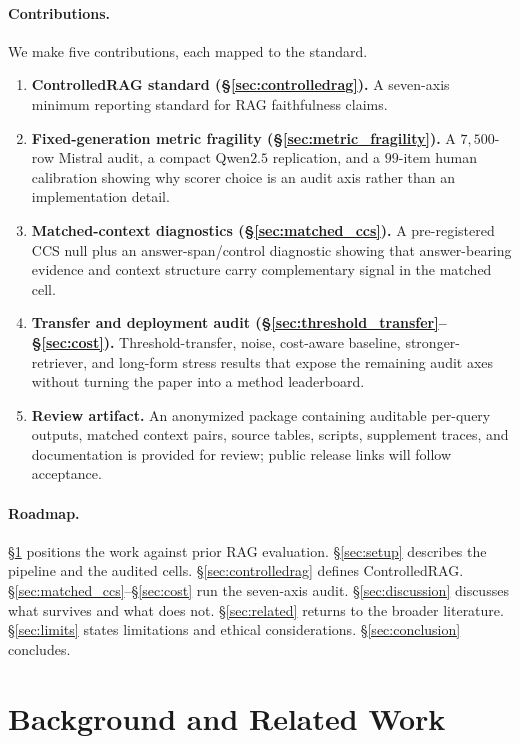 \paragraph{Contributions.} We make five contributions, each mapped to
the standard.
\begin{enumerate}
  \item \textbf{ControlledRAG standard
    (\S\ref{sec:controlledrag}).} A seven-axis minimum reporting
    standard for RAG faithfulness claims.
  \item \textbf{Fixed-generation metric fragility
    (\S\ref{sec:metric_fragility}).} A $7{,}500$-row Mistral audit, a
    compact Qwen$2.5$ replication, and a $99$-item human calibration
    showing why scorer choice is an audit axis rather than an
    implementation detail.
  \item \textbf{Matched-context diagnostics
    (\S\ref{sec:matched_ccs}).} A pre-registered CCS null plus an
    answer-span/control diagnostic showing that answer-bearing evidence
    and context structure carry complementary signal in the matched
    cell.
  \item \textbf{Transfer and deployment audit
    (\S\ref{sec:threshold_transfer}--\S\ref{sec:cost}).}
    Threshold-transfer, noise, cost-aware baseline, stronger-retriever,
    and long-form stress results that expose the remaining audit axes
    without turning the paper into a method leaderboard.
  \item \textbf{Review artifact.} An anonymized package containing
    auditable per-query outputs, matched context pairs, source tables,
    scripts, supplement traces, and documentation is provided for
    review; public release links will follow acceptance.
\end{enumerate}

\paragraph{Roadmap.} \S\ref{sec:bg} positions the work against prior
RAG evaluation. \S\ref{sec:setup} describes the pipeline and the
audited cells. \S\ref{sec:controlledrag} defines ControlledRAG.
\S\ref{sec:matched_ccs}--\S\ref{sec:cost} run the seven-axis audit.
\S\ref{sec:discussion} discusses what survives and what does not.
\S\ref{sec:related} returns to the broader literature.
\S\ref{sec:limits} states limitations and ethical considerations.
\S\ref{sec:conclusion} concludes.

\section{Background and Related Work}
\label{sec:bg}

